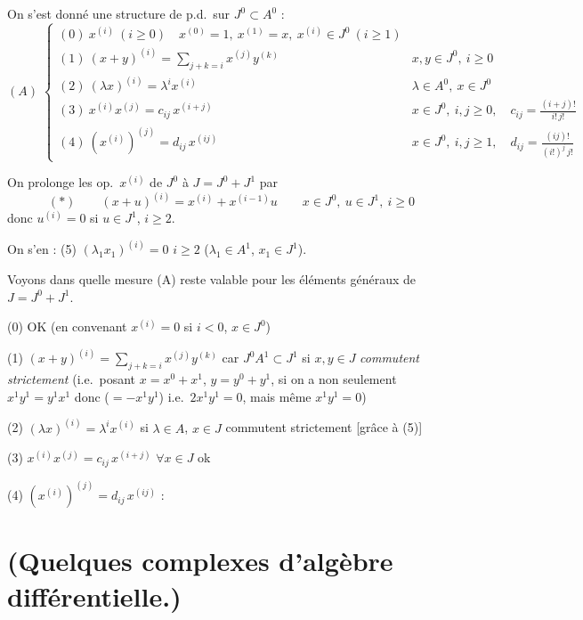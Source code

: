 \documentclass[11pt,a4paper]{article}
\begin{document}
On s'est donné une structure de p.d.\ sur $J^0 \subset A^0$ :
\[
  (A) \;
  \begin{cases}
    (0)\ x^{(i)} \ (i \geq 0) \quad x^{(0)} = 1,\ x^{(1)} = x,\ x^{(i)} \in J^0 \ (i \geq 1) \\
    (1)\ (x + y)^{(i)} = \sum_{j+k=i} x^{(j)} y^{(k)} & x, y \in J^0,\ i \geq 0 \\
    (2)\ (\lambda x)^{(i)} = \lambda^i x^{(i)} & \lambda \in A^0,\ x \in J^0 \\
    (3)\ x^{(i)} x^{(j)} = c_{ij}\, x^{(i+j)} & x \in J^0,\ i, j \geq 0, \quad c_{ij} = \frac{(i+j)!}{i!\,j!} \\
    (4)\ (x^{(i)})^{(j)} = d_{ij}\, x^{(ij)} & x \in J^0,\ i, j \geq 1, \quad d_{ij} = \frac{(ij)!}{(i!)^j\, j!}
  \end{cases}
\]

On prolonge les op.\ $x^{(i)}$ de $J^0$ à $J = J^0 + J^1$ par
\[
  (*) \qquad (x + u)^{(i)} = x^{(i)} + x^{(i-1)} u \qquad x \in J^0,\ u \in J^1,\ i \geq 0
\]
donc $u^{(i)} = 0$ si $u \in J^1$, $i \geq 2$.

On s'en  : \quad (5) $(\lambda_1 x_1)^{(i)} = 0$ \quad $i \geq 2$ \quad ($\lambda_1 \in A^1$, $x_1 \in J^1$).

Voyons dans quelle mesure (A) reste valable pour les éléments généraux de $J = J^0 + J^1$.

(0) OK (en convenant $x^{(i)} = 0$ si $i < 0$, $x \in J^0$)

(1) $(x + y)^{(i)} = \sum_{j+k=i} x^{(j)} y^{(k)}$ \quad car $J^0 A^1 \subset J^1$ \quad si $x, y \in J$ \emph{commutent} \emph{strictement}  (i.e.\ posant $x = x^0 + x^1$, $y = y^0 + y^1$, si on a non seulement $x^1 y^1 = y^1 x^1$ donc ($= -x^1 y^1$) i.e.\ $2 x^1 y^1 = 0$, mais même $x^1 y^1 = 0$)

(2) $(\lambda x)^{(i)} = \lambda^i x^{(i)}$ \quad si $\lambda \in A$, $x \in J$ commutent strictement [grâce à (5)]

(3) \struck{\ill{}} $x^{(i)} x^{(j)} = c_{ij}\, x^{(i+j)}$ \quad $\forall x \in J$ \quad ok

(4) $(x^{(i)})^{(j)} = d_{ij}\, x^{(ij)}$ :

\section{(Quelques complexes d'algèbre différentielle.)}
\end{document}
